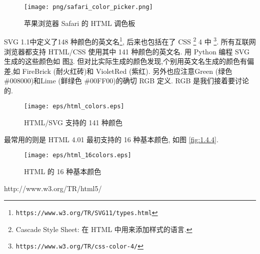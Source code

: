 \begin{figure}
	\centering
	\texttt{[image: png/safari\_color\_picker.png]}
	\caption{苹果浏览器 Safari 的 HTML 调色板}
	\label{fig:1.4.2}
\end{figure}

SVG 1.1中定义了148 种颜色的英文名\footnote{ \texttt{https://www.w3.org/TR/SVG11/types.html}}, 
后来也包括在了 CSS \footnote{Cascade Style Sheet: 在 HTML 中用来添加样式的语言.} 4 中 \footnote{ \texttt{https://www.w3.org/TR/css-color-4/}}.
所有互联网浏览器都支持 HTML/CSS 使用其中 141 种颜色的英文名.
用 Python 编程 SVG 生成的这些颜色如 图\ref{fig:1.4.3}.
但对比实际生成的颜色发现,个别用英文名生成的颜色有偏差,如 FireBrick (耐火红砖)和
VioletRed (紫红). 另外也应注意Green (绿色 \#{}008000)和Lime (鲜绿色 \#{}00FF00)的确切 RGB 定义. RGB 是我们接着要讨论的.

\begin{figure}[h]
	\centering
	\texttt{[image: eps/html\_colors.eps]}
	\caption{HTML/SVG 支持的 141 种颜色}
	\label{fig:1.4.3}
\end{figure}

最常用的则是 HTML
  4.01 
 最初支持的 16 种基本颜色, 如图 \ref{fig:1.4.4}. 

\begin{figure}[h]
	\centering
	\texttt{[image: eps/html\_16colors.eps]}
	\caption{HTML 的 16 种基本颜色}
	\label{fig:1.4.3}
\end{figure}

http://www.w3.org/TR/html5/
